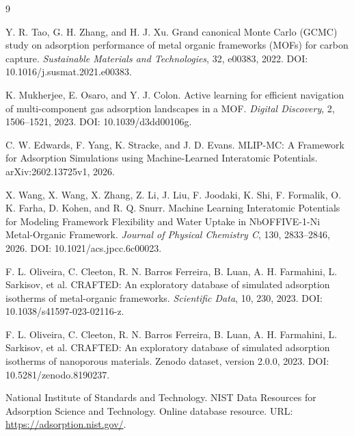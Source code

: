 \begin{thebibliography}{9}

Y. R. Tao, G. H. Zhang, and H. J. Xu.
\newblock Grand canonical Monte Carlo (GCMC) study on adsorption performance of metal organic frameworks (MOFs) for carbon capture.
\newblock \textit{Sustainable Materials and Technologies}, 32, e00383, 2022.
\newblock DOI: 10.1016/j.susmat.2021.e00383.

K. Mukherjee, E. Osaro, and Y. J. Colon.
\newblock Active learning for efficient navigation of multi-component gas adsorption landscapes in a MOF.
\newblock \textit{Digital Discovery}, 2, 1506--1521, 2023.
\newblock DOI: 10.1039/d3dd00106g.

C. W. Edwards, F. Yang, K. Stracke, and J. D. Evans.
\newblock MLIP-MC: A Framework for Adsorption Simulations using Machine-Learned Interatomic Potentials.
\newblock arXiv:2602.13725v1, 2026.

X. Wang, X. Wang, X. Zhang, Z. Li, J. Liu, F. Joodaki, K. Shi, F. Formalik, O. K. Farha, D. Kohen, and R. Q. Snurr.
\newblock Machine Learning Interatomic Potentials for Modeling Framework Flexibility and Water Uptake in NbOFFIVE-1-Ni Metal-Organic Framework.
\newblock \textit{Journal of Physical Chemistry C}, 130, 2833--2846, 2026.
\newblock DOI: 10.1021/acs.jpcc.6c00023.

F. L. Oliveira, C. Cleeton, R. N. Barros Ferreira, B. Luan, A. H. Farmahini, L. Sarkisov, et al.
\newblock CRAFTED: An exploratory database of simulated adsorption isotherms of metal-organic frameworks.
\newblock \textit{Scientific Data}, 10, 230, 2023.
\newblock DOI: 10.1038/s41597-023-02116-z.

F. L. Oliveira, C. Cleeton, R. N. Barros Ferreira, B. Luan, A. H. Farmahini, L. Sarkisov, et al.
\newblock CRAFTED: An exploratory database of simulated adsorption isotherms of nanoporous materials.
\newblock Zenodo dataset, version 2.0.0, 2023.
\newblock DOI: 10.5281/zenodo.8190237.

National Institute of Standards and Technology.
\newblock NIST Data Resources for Adsorption Science and Technology.
\newblock Online database resource.
\newblock URL: \url{https://adsorption.nist.gov/}.

\end{thebibliography}
